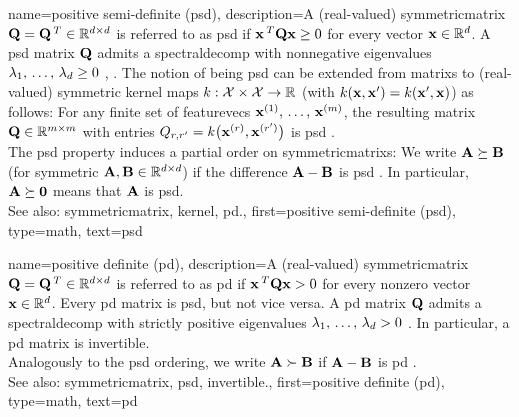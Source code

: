{name={positive semi-definite (psd)},
	description={A (real-valued) 
		\gls{symmetricmatrix} $\mathbf{Q} = \mathbf{Q}\,^{T} \in \mathbb{R}^{d \times d}$ 
	 	is referred to as psd if ${\bf x}\,^{T} \mathbf{Q} {\bf x} \geq 0$ 
		for every \gls{vector} ${\bf x} \in \mathbb{R}^{d}$. 
		A psd \gls{matrix} $\mathbf{Q}$ admits a \gls{spectraldecomp} with nonnegative 
		\glspl{eigenvalue} $\lambda_{1}, \,\ldots, \,\lambda_{d} \geq 0$
		\cite{HornMatAnalysis}, \cite{Axler2025}. 
	 	The notion of being psd can be extended from \glspl{matrix} to (real-valued) 
	 	symmetric \gls{kernel} \glspl{map} $k: \mathcal{X} \times \mathcal{X} \rightarrow \mathbb{R}$ 
	 	(with $k({\bf x},{\bf x}') = k({\bf x}',{\bf x})$)
	 	as follows: For any finite set of \glspl{featurevec} ${\bf x}^{(1)}, \,\ldots, \,{\bf x}^{(m)}$, 
	 	the resulting \gls{matrix} $\mathbf{Q} \in \mathbb{R}^{m \times m}$ with 
		entries $Q_{r,r'} = k\big({\bf x}^{(r)},{\bf x}^{(r')}\big)$ 
		is psd \cite{LearningKernelsBook}.
		\\
		The psd property induces a partial order on \glspl{symmetricmatrix}:
		We write ${\bf A} \succeq {\bf B}$ (for symmetric ${\bf A}, {\bf B} \in \mathbb{R}^{d \times d}$)
		if the difference ${\bf A} - {\bf B}$ is psd \cite[Sec. 2.4]{BoydConvexBook}. In particular, ${\bf A} \succeq \mathbf{0}$ means
		that ${\bf A}$ is psd.
			\\
		See also: \gls{symmetricmatrix}, \gls{kernel}, \gls{pd}.},
	first={positive semi-definite (psd)},
	type=math, 
	text={psd}  
}

{name={positive definite (pd)},
	description={A (real-valued)
		\gls{symmetricmatrix} $\mathbf{Q} = \mathbf{Q}\,^{T} \in \mathbb{R}^{d \times d}$
		is referred to as pd if ${\bf x}\,^{T} \mathbf{Q} {\bf x} > 0$
		for every nonzero \gls{vector} ${\bf x} \in \mathbb{R}^{d}$.
		Every pd \gls{matrix} is \gls{psd}, but not vice versa.
		A pd \gls{matrix} $\mathbf{Q}$ admits a \gls{spectraldecomp} with strictly positive
		\glspl{eigenvalue} $\lambda_{1}, \,\ldots, \,\lambda_{d} > 0$
		\cite{HornMatAnalysis}. In particular, a pd \gls{matrix} is \gls{invertible}.
		\\
		Analogously to the \gls{psd} ordering, we write ${\bf A} \succ {\bf B}$
		if ${\bf A} - {\bf B}$ is pd \cite[Sec. 2.4]{BoydConvexBook}.
		\\
		See also: \gls{symmetricmatrix}, \gls{psd}, \gls{invertible}.},
	first={positive definite (pd)},
	type=math,
	text={pd}
}


